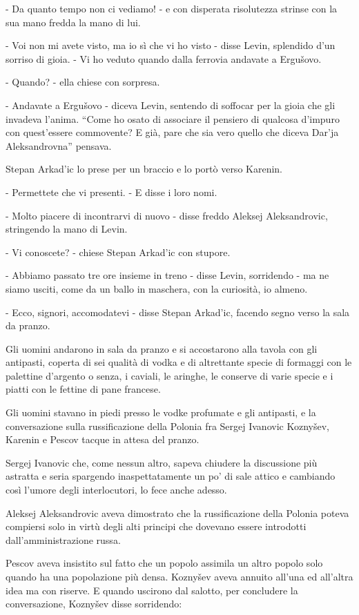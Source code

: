 - Da quanto tempo non ci vediamo! - e con disperata risolutezza strinse con la sua mano fredda la mano di lui. 

- Voi non mi avete visto, ma io sì che vi ho visto - disse Levin, splendido d'un sorriso di gioia. - Vi ho veduto quando dalla ferrovia andavate a Ergušovo. 

- Quando? - ella chiese con sorpresa. 

- Andavate a Ergušovo - diceva Levin, sentendo di soffocar per la gioia che gli invadeva l'anima. ``Come ho osato di associare il pensiero di qualcosa d'impuro con quest'essere commovente? E già, pare che sia vero quello che diceva Dar'ja Aleksandrovna'' pensava. 

Stepan Arkad'ic lo prese per un braccio e lo portò verso Karenin. 

- Permettete che vi presenti. - E disse i loro nomi. 

- Molto piacere di incontrarvi di nuovo - disse freddo Aleksej Aleksandrovic, stringendo la mano di Levin. 

- Vi conoscete? - chiese Stepan Arkad'ic con stupore. 

- Abbiamo passato tre ore insieme in treno - disse Levin, sorridendo - ma ne siamo usciti, come da un ballo in maschera, con la curiosità, io almeno. 

- Ecco, signori, accomodatevi - disse Stepan Arkad'ic, facendo segno verso la sala da pranzo. 

Gli uomini andarono in sala da pranzo e si accostarono alla tavola con gli antipasti, coperta di sei qualità di vodka e di altrettante specie di formaggi con le palettine d'argento o senza, i caviali, le aringhe, le conserve di varie specie e i piatti con le fettine di pane francese. 

Gli uomini stavano in piedi presso le vodke profumate e gli antipasti, e la conversazione sulla russificazione della Polonia fra Sergej Ivanovic Koznyšev, Karenin e Pescov tacque in attesa del pranzo. 

Sergej Ivanovic che, come nessun altro, sapeva chiudere la discussione più astratta e seria spargendo inaspettatamente un po' di sale attico e cambiando così l'umore degli interlocutori, lo fece anche adesso. 

Aleksej Aleksandrovic aveva dimostrato che la russificazione della Polonia poteva compiersi solo in virtù degli alti principi che dovevano essere introdotti dall'amministrazione russa. 

Pescov aveva insistito sul fatto che un popolo assimila un altro popolo solo quando ha una popolazione più densa. Koznyšev aveva annuito all'una ed all'altra idea ma con riserve. E quando uscirono dal salotto, per concludere la conversazione, Koznyšev disse sorridendo: 

